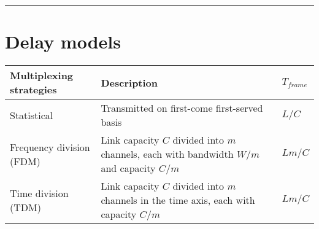 \documentclass{form}
\begin{document}
\vspace{-0em}\noindent\rule{\textwidth}{1.0pt}\vspace{-2em}

\section*{Delay models}
\begin{center}
    \begin{tabular}{@{}l | p{139mm} | l@{}}
        \textbf{Multiplexing strategies}        & \textbf{Description}                                                                      & $T_{frame}$ \\ \hline
        Statistical              & Transmitted on first-come first-served basis                                              & $L/C$       \\
        Frequency division (FDM) & Link capacity $C$ divided into $m$ channels, each with bandwidth $W/m$ and capacity $C/m$ & $Lm/C$      \\
        Time division (TDM)      & Link capacity $C$ divided into $m$ channels in the time axis, each with capacity $C/m$    & $Lm/C$      \\
    \end{tabular}
\end{center}
\end{document}
